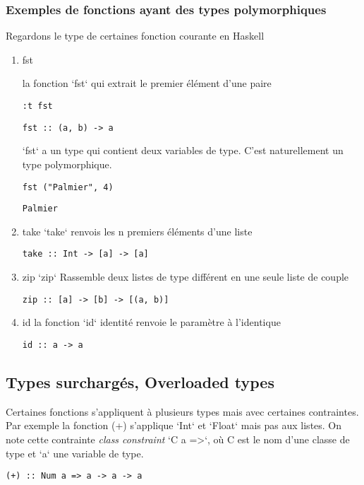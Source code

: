 \documentclass[11pt]{article}
\begin{document}
\subsubsection{Exemples de fonctions ayant des types polymorphiques}
\label{sec:org9d499ea}
Regardons le type de certaines fonction courante en Haskell
\begin{enumerate}
\item fst
\label{sec:org9f30c20}

la fonction `fst` qui  extrait le premier élément d'une paire
\begin{verbatim}
:t fst
\end{verbatim}
\begin{verbatim}
fst :: (a, b) -> a
\end{verbatim}


`fst` a un type qui contient deux variables de type. C'est naturellement un type polymorphique.

\begin{verbatim}
fst ("Palmier", 4)
\end{verbatim}
\begin{verbatim}
Palmier
\end{verbatim}

\item take
\label{sec:org0f01ede}
`take` renvois les n premiers éléments d'une liste
\begin{verbatim}
take :: Int -> [a] -> [a]
\end{verbatim}

\item zip
\label{sec:orge19f3d3}
`zip` Rassemble deux listes de type différent en une seule liste de couple
\begin{verbatim}
zip :: [a] -> [b] -> [(a, b)]
\end{verbatim}

\item id
\label{sec:org17c2c84}
la fonction `id` identité  renvoie le paramètre à l'identique
\begin{verbatim}
id :: a -> a
\end{verbatim}
\end{enumerate}

\subsection{Types surchargés,  Overloaded types}
\label{sec:org7b444d9}
Certaines fonctions s'appliquent à plusieurs types mais avec certaines contraintes. Par exemple la fonction (+)  s'applique `Int` et `Float`  mais pas aux listes.  On note cette contrainte \emph{class constraint}  `C a =>`,   où C est le nom d'une classe de type et `a` une variable de type.   
\begin{verbatim}
(+) :: Num a => a -> a -> a
\end{verbatim}
\end{document}
